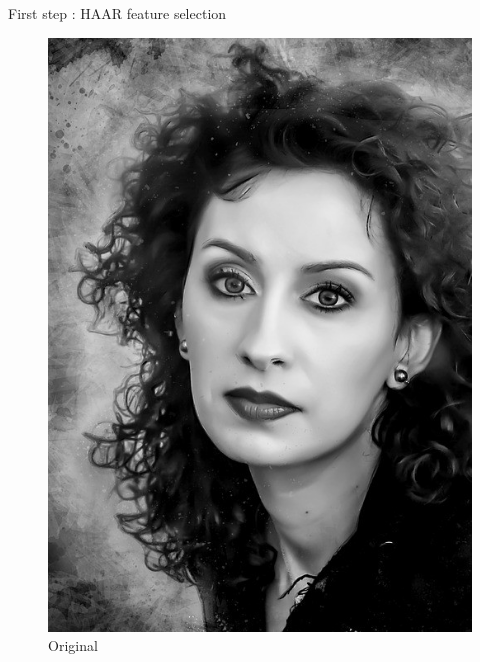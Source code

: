 \documentclass[tikz,table,border=2mm]{beamer}
\begin{document}
\begin{frame}{First step : HAAR feature selection}

\begin{figure}[ht]
\begin{minipage}[b]{0.3\linewidth}
    \centering
    \includegraphics[width=\textwidth]{images/haar_feature_1.jpg}
    \caption{Original}
\end{minipage}
 \hspace{0.5cm}
\begin{minipage}[b]{0.3\linewidth}
    \centering

\end{minipage}
\end{figure}
\end{frame}
\end{document}
